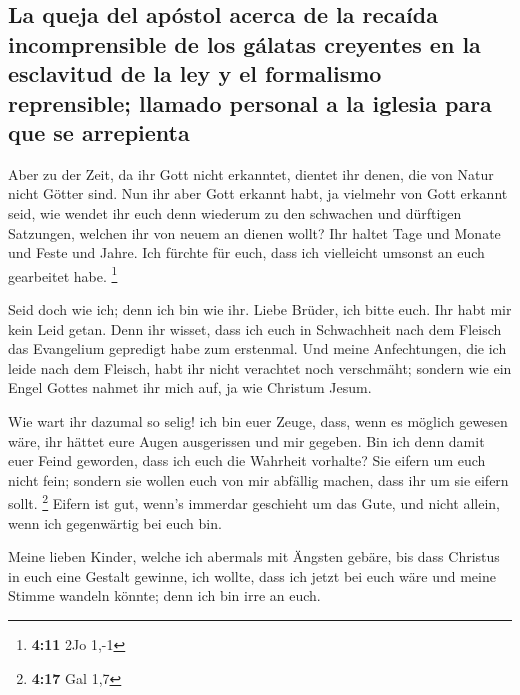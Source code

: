 \hypertarget{la-queja-del-apuxf3stol-acerca-de-la-recauxedda-incomprensible-de-los-guxe1latas-creyentes-en-la-esclavitud-de-la-ley-y-el-formalismo-reprensible-llamado-personal-a-la-iglesia-para-que-se-arrepienta}{%
\subsection{La queja del apóstol acerca de la recaída incomprensible de
los gálatas creyentes en la esclavitud de la ley y el formalismo
reprensible; llamado personal a la iglesia para que se
arrepienta}\label{la-queja-del-apuxf3stol-acerca-de-la-recauxedda-incomprensible-de-los-guxe1latas-creyentes-en-la-esclavitud-de-la-ley-y-el-formalismo-reprensible-llamado-personal-a-la-iglesia-para-que-se-arrepienta}}

 Aber zu der Zeit, da ihr Gott nicht erkanntet, dientet
ihr denen, die von Natur nicht Götter sind.  Nun ihr aber
Gott erkannt habt, ja vielmehr von Gott erkannt seid, wie wendet ihr
euch denn wiederum zu den schwachen und dürftigen Satzungen, welchen ihr
von neuem an dienen wollt?  Ihr haltet Tage und Monate
und Feste und Jahre.  Ich fürchte für euch, dass ich
vielleicht umsonst an euch gearbeitet habe. \footnote{\textbf{4:11} 2Jo
  1,-1}

 Seid doch wie ich; denn ich bin wie ihr. Liebe Brüder,
ich bitte euch. Ihr habt mir kein Leid getan.  Denn ihr
wisset, dass ich euch in Schwachheit nach dem Fleisch das Evangelium
gepredigt habe zum erstenmal.  Und meine Anfechtungen,
die ich leide nach dem Fleisch, habt ihr nicht verachtet noch
verschmäht; sondern wie ein Engel Gottes nahmet ihr mich auf, ja wie
Christum Jesum.

 Wie wart ihr dazumal so selig! ich bin euer Zeuge, dass,
wenn es möglich gewesen wäre, ihr hättet eure Augen ausgerissen und mir
gegeben.  Bin ich denn damit euer Feind geworden, dass
ich euch die Wahrheit vorhalte?  Sie eifern um euch nicht
fein; sondern sie wollen euch von mir abfällig machen, dass ihr um sie
eifern sollt. \footnote{\textbf{4:17} Gal 1,7}  Eifern
ist gut, wenn's immerdar geschieht um das Gute, und nicht allein, wenn
ich gegenwärtig bei euch bin.

 Meine lieben Kinder, welche ich abermals mit Ängsten
gebäre, bis dass Christus in euch eine Gestalt gewinne, 
ich wollte, dass ich jetzt bei euch wäre und meine Stimme wandeln
könnte; denn ich bin irre an euch.

